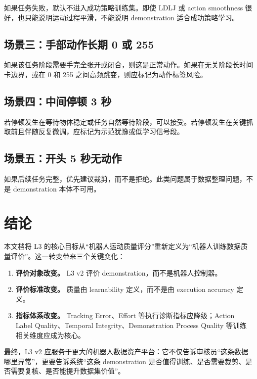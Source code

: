 \documentclass[UTF8,zihao=-4,oneside,openany]{ctexrep}
\begin{document}
如果任务失败，默认不进入成功策略训练集。即使 LDLJ 或 action smoothness 很好，也只能说明运动过程平滑，不能说明 demonstration 适合成功策略学习。

\subsection{场景三：手部动作长期 0 或 255}

如果该任务阶段需要手完全张开或闭合，则这是正常动作。如果在无关阶段长时间卡边界，或在 0 和 255 之间高频跳变，则应标记为动作标签风险。

\subsection{场景四：中间停顿 3 秒}

若停顿发生在等待物体稳定或任务自然等待阶段，可以接受。若停顿发生在关键抓取前且伴随反复微调，应标记为示范犹豫或低学习信号段。

\subsection{场景五：开头 5 秒无动作}

如果后续任务完整，优先建议裁剪，而不是拒绝。此类问题属于数据整理问题，不是 demonstration 本体不可用。

\section{结论}

本文档将 L3 的核心目标从“机器人运动质量评分”重新定义为“机器人训练数据质量评价”。这一转变带来三个关键变化：

\begin{enumerate}
  \item \textbf{评价对象改变。} L3 v2 评价 demonstration，而不是机器人控制器。
  \item \textbf{评价标准改变。} 质量由 learnability 定义，而不是由 execution accuracy 定义。
  \item \textbf{指标体系改变。} Tracking Error、Effort 等执行诊断指标应降级；Action Label Quality、Temporal Integrity、Demonstration Process Quality 等训练相关维度应成为核心。
\end{enumerate}

最终，L3 v2 应服务于更大的机器人数据资产平台：它不仅告诉审核员“这条数据哪里异常”，更要告诉系统“这条 demonstration 是否值得训练、是否需要裁剪、是否需要复核、是否能提升数据集价值”。

\newpage
\end{document}

